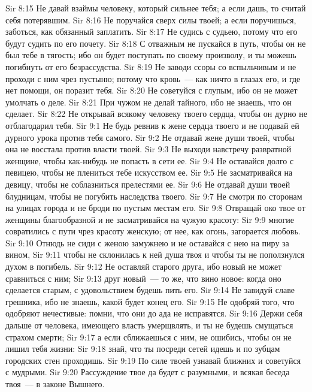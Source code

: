 \vs Sir 8:15 Не давай взаймы человеку, который сильнее тебя; а если дашь, то считай себя потерявшим.
\vs Sir 8:16 Не поручайся сверх силы твоей; а если поручишься, заботься, как обязанный заплатить.
\vs Sir 8:17 Не судись с судьею, потому что его будут судить по его почету.
\vs Sir 8:18 С отважным не пускайся в путь, чтобы он не был тебе в тягость; ибо он будет поступать по своему произволу, и ты можешь погибнуть от его безрассудства.
\vs Sir 8:19 Не заводи ссоры со вспыльчивым и не проходи с ним чрез пустыню; потому что кровь~--- как ничто в глазах его, и где нет помощи, он поразит тебя.
\vs Sir 8:20 Не советуйся с глупым, ибо он не может умолчать о деле.
\vs Sir 8:21 При чужом не делай тайного, ибо не знаешь, что он сделает.
\vs Sir 8:22 Не открывай всякому человеку твоего сердца, чтобы он дурно не отблагодарил тебя.
\vs Sir 9:1 Не будь ревнив к жене сердца твоего и не подавай ей дурного урока против тебя самого.
\vs Sir 9:2 Не отдавай жене души твоей, чтобы она не восстала против власти твоей.
\vs Sir 9:3 Не выходи навстречу развратной женщине, чтобы как-нибудь не попасть в сети ее.
\vs Sir 9:4 Не оставайся долго с певицею, чтобы не плениться тебе искусством ее.
\vs Sir 9:5 Не засматривайся на девицу, чтобы не соблазниться прелестями ее.
\vs Sir 9:6 Не отдавай души твоей блудницам, чтобы не погубить наследства твоего.
\vs Sir 9:7 Не смотри по сторонам на улицах города и не броди по пустым местам его.
\vs Sir 9:8 Отвращай око твое от женщины благообразной и не засматривайся на чужую красоту:
\vs Sir 9:9 многие совратились с пути чрез красоту женскую; от нее, как огонь, загорается любовь.
\vs Sir 9:10 Отнюдь не сиди с женою замужнею и не оставайся с нею на пиру за вином,
\vs Sir 9:11 чтобы не склонилась к ней душа твоя и чтобы ты не поползнулся духом в погибель.
\vs Sir 9:12 Не оставляй старого друга, ибо новый не может сравниться с ним;
\vs Sir 9:13 друг новый~--- то же, что вино новое: когда оно сделается старым, с удовольствием будешь пить его.
\rsbpar\vs Sir 9:14 Не завидуй славе грешника, ибо не знаешь, какой будет конец его.
\vs Sir 9:15 Не одобряй того, что одобряют нечестивые: помни, что они до  ада не исправятся.
\vs Sir 9:16 Держи себя дальше от человека, имеющего власть умерщвлять, и ты не будешь смущаться страхом смерти;
\vs Sir 9:17 а если сближаешься с ним, не ошибись, чтобы он не лишил тебя жизни:
\vs Sir 9:18 знай, что ты посреди сетей идешь и по зубцам городских стен проходишь.
\vs Sir 9:19 По силе твоей узнавай ближних и советуйся с мудрыми.
\vs Sir 9:20 Рассуждение твое да будет с разумными, и всякая беседа твоя~--- в законе Вышнего.
